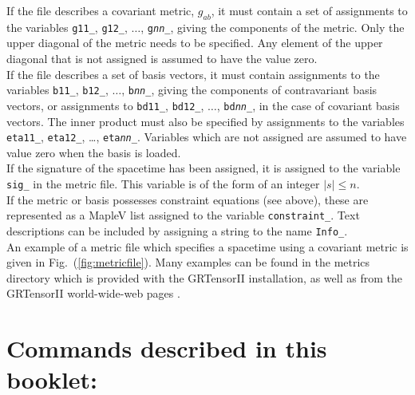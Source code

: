 \documentclass{article}
\begin{document}
If the file describes a covariant metric, $g_{ab}$, it must contain a
set of assignments to the variables \texttt{g11\_}, \texttt{g12\_},
$\ldots$, \texttt{g\textsl{nn}\_}, giving the components of the
metric. Only the upper diagonal of the metric needs to be
specified. Any element of the upper diagonal that is not assigned is
assumed to have the value zero.\\

If the file describes a set of basis vectors, it must contain
assignments to the variables \texttt{b11\_}, \texttt{b12\_}, $\ldots$,
\texttt{b\textsl{nn}\_}, giving the components of contravariant basis
vectors, or assignments to \texttt{bd11\_}, \texttt{bd12\_}, $\ldots$,
\texttt{bd\textsl{nn}\_}, in the case of covariant basis vectors. The
inner product must also be specified by assignments to the variables
\texttt{eta11\_}, \texttt{eta12\_}, \ldots, \texttt{eta\textsl{nn}\_}.
Variables which are not assigned are assumed to have value zero when
the basis is loaded.\\

If the signature of the spacetime has been assigned, it is assigned
to the variable \texttt{sig\_} in the metric file. This variable
is of the form of an integer $|s|\leq n$.\\

If the metric or basis possesses constraint equations (see above),
these are represented as a MapleV list assigned to the variable
\texttt{constraint\_}.  Text descriptions can be included by assigning
a string to the name \texttt{Info\_}.\\

An example of a metric file which specifies a spacetime using a covariant
metric is given in Fig.~(\ref{fig:metricfile}). Many examples can
be found in the metrics directory which is provided with the GRTensorII
installation, as well as from the GRTensorII world-wide-web pages
\cite{www}.
%
\vfill


\pagebreak
\section*{Commands described in this booklet:}
  \noindent
    \dotfill \pageref{spec:makeg}\\
\end{document}
